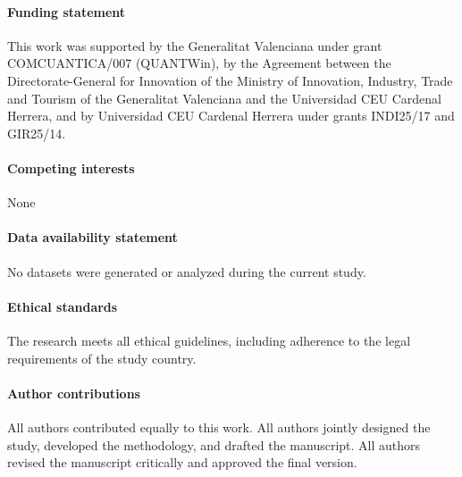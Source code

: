 \documentclass{article}%
\theoremstyle{definition}
\numberwithin{equation}{section}
\begin{document}

\paragraph{Funding statement}
This work was supported by the Generalitat Valenciana under grant COMCUANTICA/007 (QUANTWin), by the Agreement between the Directorate-General for Innovation of the Ministry of Innovation, Industry, Trade and Tourism of the Generalitat Valenciana and the Universidad CEU Cardenal Herrera, and by Universidad CEU Cardenal Herrera under grants INDI25/17 and GIR25/14.

\paragraph{Competing interests}
None

\paragraph{Data availability statement}
No datasets were generated or analyzed during the current study.

\paragraph{Ethical standards}
The research meets all ethical guidelines, including adherence to the legal requirements of the study country.

\paragraph{Author contributions}
All authors contributed equally to this work. All authors jointly designed the study, developed the methodology, and drafted the manuscript. All authors revised the manuscript critically and approved the final version.

\end{document}
